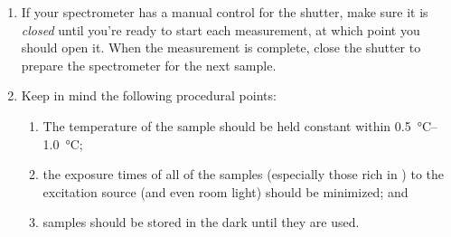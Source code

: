 \begin{enumerate}
	\item If your spectrometer has a manual control for the shutter, make sure it is \emph{closed} until you're ready to start each measurement, at which point you should open it. 
	When the measurement is complete, close the shutter to prepare the spectrometer for the next sample. 	
	\item Keep in mind the following procedural points: 
	\begin{enumerate}
		\item The temperature of the sample should be held constant within \qtyrange{0.5}{1.0}{\celsius}; 
		\item the exposure times of all of the samples (especially those rich in ) to the excitation source (and even room light) should be minimized; and 
		\item samples should be stored in the dark until they are used.
	\end{enumerate}
\end{enumerate}


